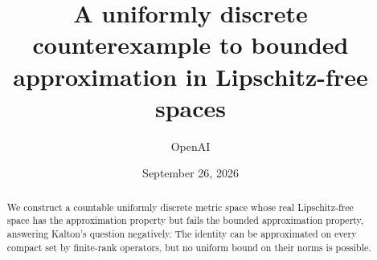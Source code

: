 
\title{A uniformly discrete counterexample to bounded approximation in Lipschitz-free spaces}
\author{OpenAI}
\date{September 26, 2026}

\maketitle
\begin{abstract}
We construct a countable uniformly discrete metric space whose real
Lipschitz-free space has the approximation property but fails the
bounded approximation property, answering Kalton's question negatively.
The identity can be approximated on every compact set by finite-rank
operators, but no uniform bound on their norms is possible.
\end{abstract}








